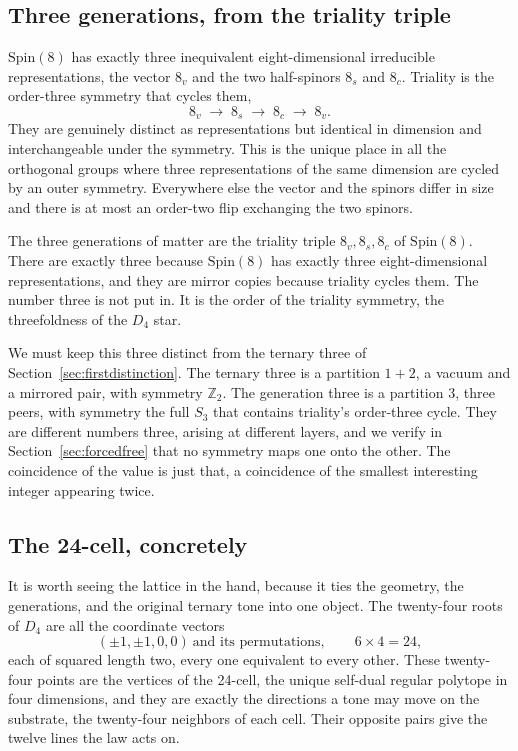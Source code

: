 \subsection{Three generations, from the triality triple}

$\mathrm{Spin}(8)$ has exactly three inequivalent eight-dimensional irreducible representations, the vector $8_v$ and
the two half-spinors $8_s$ and $8_c$. Triality is the order-three symmetry that cycles them,
\begin{equation}
  8_v \;\to\; 8_s \;\to\; 8_c \;\to\; 8_v .
\end{equation}
They are genuinely distinct as representations but identical in dimension and interchangeable under the symmetry. This
is the unique place in all the orthogonal groups where three representations of the same dimension are cycled by an
outer symmetry. Everywhere else the vector and the spinors differ in size and there is at most an order-two flip
exchanging the two spinors.

\begin{result}
The three generations of matter are the triality triple $8_v, 8_s, 8_c$ of $\mathrm{Spin}(8)$. There are exactly three
because $\mathrm{Spin}(8)$ has exactly three eight-dimensional representations, and they are mirror copies because
triality cycles them. The number three is not put in. It is the order of the triality symmetry, the threefoldness of
the $D_4$ star.
\end{result}

We must keep this three distinct from the ternary three of Section~\ref{sec:firstdistinction}. The ternary three is a
partition $1 + 2$, a vacuum and a mirrored pair, with symmetry $\mathbb{Z}_2$. The generation three is a partition
$3$, three peers, with symmetry the full $S_3$ that contains triality's order-three cycle. They are different numbers
three, arising at different layers, and we verify in Section~\ref{sec:forcedfree} that no symmetry maps one onto the
other. The coincidence of the value is just that, a coincidence of the smallest interesting integer appearing twice.

\subsection{The 24-cell, concretely}

It is worth seeing the lattice in the hand, because it ties the geometry, the generations, and the original ternary
tone into one object. The twenty-four roots of $D_4$ are all the coordinate vectors
\begin{equation}
  (\pm 1, \pm 1, 0, 0) \ \text{and its permutations}, \qquad 6 \times 4 = 24,
\end{equation}
each of squared length two, every one equivalent to every other. These twenty-four points are the vertices of the
24-cell, the unique self-dual regular polytope in four dimensions, and they are exactly the directions a tone may move
on the substrate, the twenty-four neighbors of each cell. Their opposite pairs give the twelve lines the law acts on.

